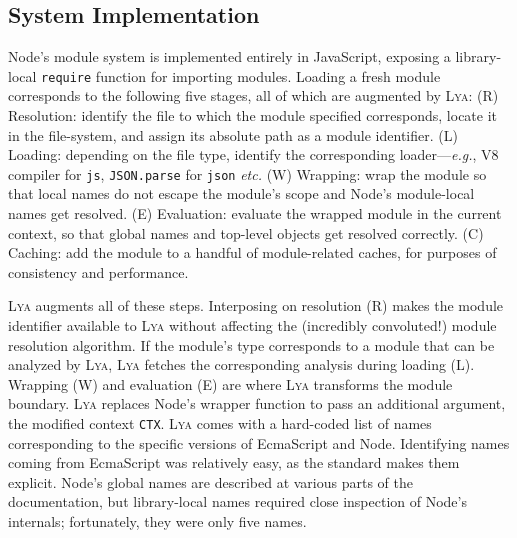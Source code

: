 \documentclass[letterpaper,twocolumn,10pt]{article}
\def\eg{{\em e.g.}, }
\def\etc{{\em etc.}\xspace}
\newcommand{\ttt}[1]{\texttt{#1}}
\newcommand{\sys}{{\scshape Lya}\xspace}
\begin{document}
\subsection{System Implementation}
\label{impl1}


Node's module system is implemented entirely in JavaScript, exposing a library-local \ttt{require} function for importing modules.
Loading a fresh module %
  corresponds to the following five stages, all of which are augmented by \sys:
(R) Resolution: identify the file to which the module specified corresponds, locate it in the file-system, and assign its absolute path as a module identifier.
(L) Loading: depending on the file type, identify the corresponding loader---\eg V8 compiler for \ttt{js}, \ttt{JSON.parse} for \ttt{json} \etc
(W) Wrapping: wrap the module so that local names do not escape the module's scope and Node's module-local names get resolved.
(E) Evaluation: evaluate the wrapped module in the current context, so that global names and top-level objects get resolved correctly.
(C) Caching: add the module to a handful of module-related caches, for purposes of consistency and performance.

\sys augments all of these steps.
Interposing on resolution (R) makes the module identifier available to \sys without affecting the (incredibly convoluted!) module resolution algorithm.
If the module's type corresponds to a module that can be analyzed by \sys, \sys fetches the corresponding analysis during loading (L).
Wrapping (W) and evaluation (E) are where \sys transforms the module boundary.
\sys replaces Node's wrapper function to pass an additional argument, the modified context \ttt{CTX}.
\sys comes with a hard-coded list of names corresponding to the specific versions of EcmaScript and Node.
Identifying names coming from EcmaScript was relatively easy, as the standard makes them explicit.
Node's global names are described at various parts of the documentation, but library-local names required close inspection of Node's internals; fortunately, they were only five names.
\end{document}
